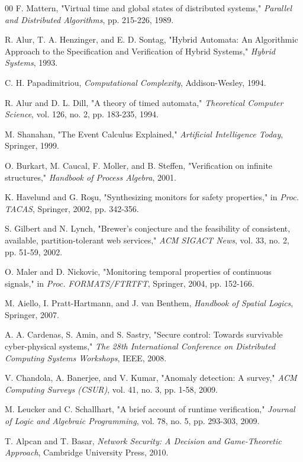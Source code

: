 \documentclass[conference]{IEEEtran}
\begin{document}
\begin{thebibliography}{00}
 F. Mattern, "Virtual time and global states of distributed systems," \textit{Parallel and Distributed Algorithms}, pp. 215-226, 1989.

 R. Alur, T. A. Henzinger, and E. D. Sontag, "Hybrid Automata: An Algorithmic Approach to the Specification and Verification of Hybrid Systems," \textit{Hybrid Systems}, 1993.

 C. H. Papadimitriou, \textit{Computational Complexity}, Addison-Wesley, 1994.

 R. Alur and D. L. Dill, "A theory of timed automata," \textit{Theoretical Computer Science}, vol. 126, no. 2, pp. 183-235, 1994.

 M. Shanahan, "The Event Calculus Explained," \textit{Artificial Intelligence Today}, Springer, 1999.

 O. Burkart, M. Caucal, F. Moller, and B. Steffen, "Verification on infinite structures," \textit{Handbook of Process Algebra}, 2001.

 K. Havelund and G. Roşu, "Synthesizing monitors for safety properties," in \textit{Proc. TACAS}, Springer, 2002, pp. 342-356.

 S. Gilbert and N. Lynch, "Brewer's conjecture and the feasibility of consistent, available, partition-tolerant web services," \textit{ACM SIGACT News}, vol. 33, no. 2, pp. 51-59, 2002.

 O. Maler and D. Nickovic, "Monitoring temporal properties of continuous signals," in \textit{Proc. FORMATS/FTRTFT}, Springer, 2004, pp. 152-166.

 M. Aiello, I. Pratt-Hartmann, and J. van Benthem, \textit{Handbook of Spatial Logics}, Springer, 2007.

 A. A. Cardenas, S. Amin, and S. Sastry, "Secure control: Towards survivable cyber-physical systems," \textit{The 28th International Conference on Distributed Computing Systems Workshops}, IEEE, 2008.

 V. Chandola, A. Banerjee, and V. Kumar, "Anomaly detection: A survey," \textit{ACM Computing Surveys (CSUR)}, vol. 41, no. 3, pp. 1-58, 2009.

 M. Leucker and C. Schallhart, "A brief account of runtime verification," \textit{Journal of Logic and Algebraic Programming}, vol. 78, no. 5, pp. 293-303, 2009.

 T. Alpcan and T. Basar, \textit{Network Security: A Decision and Game-Theoretic Approach}, Cambridge University Press, 2010.

\end{thebibliography}
\end{document}
